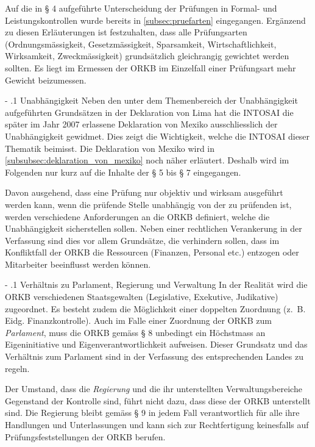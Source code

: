 \documentclass[10pt]{article}
\makeatletter
\renewcommand\paragraph{\@startsection{paragraph}{3}{0mm}{-\baselineskip}{.1\baselineskip}{\normalfont\normalsize\bfseries}}
\renewcommand\paragraph{%
\@startsection{paragraph}{3}{0mm}%
{-\baselineskip}%
{.1\baselineskip}%
{\normalfont\normalsize\bfseries}}
\makeatother
\begin{document}
Auf die in § 4 aufgeführte Unterscheidung der Prüfungen in Formal- und Leistungskontrollen wurde bereits in \vref{subsec:pruefarten} eingegangen. Ergänzend zu diesen Erläuterungen ist festzuhalten, dass alle Prüfungsarten (Ordnungsmässigkeit, Gesetzmässigkeit, Sparsamkeit, Wirtschaftlichkeit, Wirksamkeit, Zweckmässigkeit) grundsätzlich gleichrangig gewichtet werden sollten. Es liegt im Ermessen der ORKB im Einzelfall einer Prüfungsart mehr Gewicht beizumessen.

\paragraph{Unabhängigkeit}\label{para:unabhaengigkeit}
Neben den unter dem Themenbereich der Unabhängigkeit aufgeführten Grundsätzen in der Deklaration von Lima hat die INTOSAI die später im Jahr 2007 erlassene Deklaration von Mexiko ausschliesslich der Unabhängigkeit gewidmet. Dies zeigt die Wichtigkeit, welche die INTOSAI dieser Thematik beimisst. Die Deklaration von Mexiko wird in \vref{subsubsec:deklaration_von_mexiko} noch näher erläutert. Deshalb wird im Folgenden nur kurz auf die Inhalte der § 5 bis § 7 eingegangen. 

Davon ausgehend, dass eine Prüfung nur objektiv und wirksam ausgeführt werden kann, wenn die prüfende Stelle unabhängig von der zu prüfenden ist, werden verschiedene Anforderungen an die ORKB definiert, welche die Unabhängigkeit sicherstellen sollen. Neben einer rechtlichen Verankerung in der Verfassung sind dies vor allem Grundsätze, die verhindern sollen, dass im Konfliktfall der ORKB die Ressourcen (Finanzen, Personal etc.) entzogen oder Mitarbeiter beeinflusst werden können.

\paragraph{Verhältnis zu Parlament, Regierung und Verwaltung}\label{para:verhaeltnis_zu_parlament__regierung_und_verwaltung}
In der Realität wird die ORKB verschiedenen Staatsgewalten (Legislative, Exekutive, Judikative) zugeordnet. Es besteht zudem die Möglichkeit einer doppelten Zuordnung (z.~B. Eidg. Finanzkontrolle). Auch im Falle einer Zuordnung der ORKB zum \textit{Parlament}, muss die ORKB gemäss § 8 unbedingt ein Höchstmass an Eigeninitiative und Eigenverantwortlichkeit aufweisen. Dieser Grundsatz und das Verhältnis zum Parlament sind in der Verfassung des entsprechenden Landes zu regeln.

Der Umstand, dass die \textit{Regierung} und die ihr unterstellten Verwaltungsbereiche Gegen­stand der Kontrolle sind, führt nicht dazu, dass diese der ORKB unterstellt sind. Die Regierung bleibt gemäss § 9 in jedem Fall verantwortlich für alle ihre Handlungen und Unterlassungen und kann sich zur Rechtfertigung keinesfalls auf Prüfungsfeststellungen der ORKB berufen.
\end{document}

